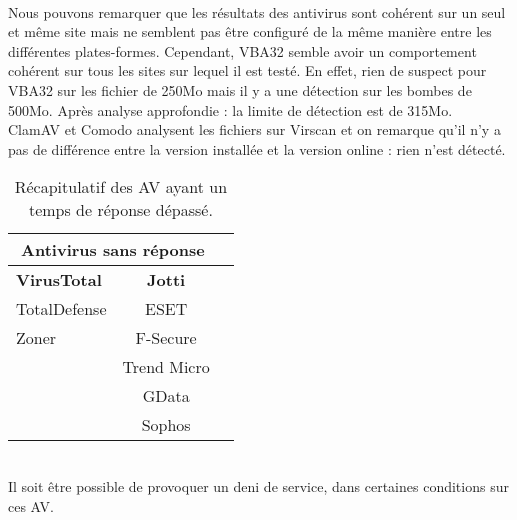 \documentclass[smallextended]{svjour3}       %
\begin{document}
\\Nous pouvons remarquer que les résultats des antivirus sont cohérent sur un seul et même site mais ne semblent pas être configuré de la même manière entre les différentes plates-formes. Cependant, VBA32 semble avoir un comportement cohérent sur tous les sites sur lequel il est testé. En effet, rien de suspect pour VBA32 sur les fichier de 250Mo mais il y a une détection sur les bombes de 500Mo. Après analyse approfondie : la limite de détection est de 315Mo.\\
ClamAV et Comodo analysent les fichiers sur Virscan et on remarque qu'il n'y a pas de différence entre la version installée et la version online : rien n'est détecté.\\
\begin{table}[ht!]
\begin{normalsize}
\begin{center}
\begin{tabular}{|l|c|c|}
    \hline
	\multicolumn{2}{|c|}{\textbf{Antivirus sans réponse}} \\
    \hline
    \textbf{VirusTotal} & \textbf{Jotti} \\
     \hline
    TotalDefense & ESET\\
    \hline
    Zoner & F-Secure\\
    \hline
     & Trend Micro\\
    \hline
     & GData\\
    \hline
     & Sophos\\
    \hline
\end{tabular}
\end{center}
\end{normalsize}
\caption{Récapitulatif des AV ayant un temps de réponse dépassé.}
\end{table}
\\
Il soit être possible de provoquer un deni de service, dans certaines conditions sur ces AV.
\end{document}
